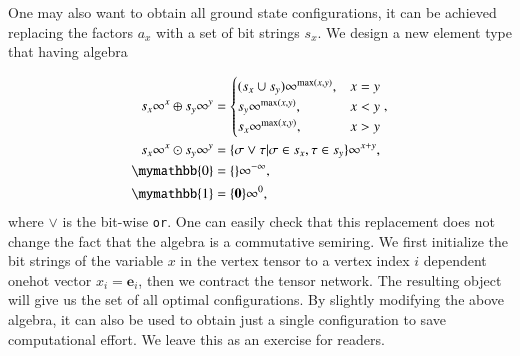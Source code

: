 \documentclass{article}
\newcommand{\<}{\langle}
\renewcommand{\>}{\rangle}
\theoremstyle{definition}\newtheorem{definition}{\textit{Definition}}
\begin{document}
One may also want to obtain all ground state configurations, it can be achieved replacing the factors $a_x$ with a set of bit strings $s_x$.
We design a new element type that having algebra

\begin{align}
\begin{split}
    s_x\infty^x \oplus s_y\infty^y &= \begin{cases}
        (s_x \cup s_y)\infty^{\max(x,y)}, & x = y\\
        s_y\infty^{\max(x,y)}, & x < y\\
        s_x\infty^{\max(x,y)}, & x > y
    \end{cases},\\
    s_x\infty^x \odot s_y\infty^y &= \{\sigma \lor \tau | \sigma \in s_x, \tau \in s_y\}\infty^{x+y},\\
    \mymathbb{0} &= \{\}\infty^{-\infty},\\
    \mymathbb{1} &= \{\boldsymbol 0\}\infty^{0},
\end{split}
\end{align}
where $\vee$ is the bit-wise \texttt{or}. One can easily check that this replacement does not change the fact that the algebra is a commutative semiring.
We first initialize the bit strings of the variable $x$ in the vertex tensor to a vertex index $i$ dependent onehot vector $x_i = \boldsymbol{e}_{i}$,
then we contract the tensor network. The resulting object will give us the set of all optimal configurations.
By slightly modifying the above algebra, it can also be used to obtain just a single configuration to save computational effort.
We leave this as an exercise for readers.
\end{document}
